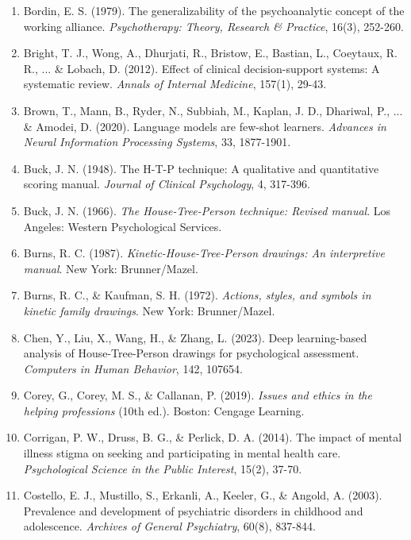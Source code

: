 \begin{enumerate}
\item Bordin, E. S. (1979). The generalizability of the psychoanalytic concept of the working alliance. \textit{Psychotherapy: Theory, Research \& Practice}, 16(3), 252-260.

\item Bright, T. J., Wong, A., Dhurjati, R., Bristow, E., Bastian, L., Coeytaux, R. R., ... \& Lobach, D. (2012). Effect of clinical decision-support systems: A systematic review. \textit{Annals of Internal Medicine}, 157(1), 29-43.

\item Brown, T., Mann, B., Ryder, N., Subbiah, M., Kaplan, J. D., Dhariwal, P., ... \& Amodei, D. (2020). Language models are few-shot learners. \textit{Advances in Neural Information Processing Systems}, 33, 1877-1901.

\item Buck, J. N. (1948). The H-T-P technique: A qualitative and quantitative scoring manual. \textit{Journal of Clinical Psychology}, 4, 317-396.

\item Buck, J. N. (1966). \textit{The House-Tree-Person technique: Revised manual}. Los Angeles: Western Psychological Services.

\item Burns, R. C. (1987). \textit{Kinetic-House-Tree-Person drawings: An interpretive manual}. New York: Brunner/Mazel.

\item Burns, R. C., \& Kaufman, S. H. (1972). \textit{Actions, styles, and symbols in kinetic family drawings}. New York: Brunner/Mazel.

\item Chen, Y., Liu, X., Wang, H., \& Zhang, L. (2023). Deep learning-based analysis of House-Tree-Person drawings for psychological assessment. \textit{Computers in Human Behavior}, 142, 107654.

\item Corey, G., Corey, M. S., \& Callanan, P. (2019). \textit{Issues and ethics in the helping professions} (10th ed.). Boston: Cengage Learning.

\item Corrigan, P. W., Druss, B. G., \& Perlick, D. A. (2014). The impact of mental illness stigma on seeking and participating in mental health care. \textit{Psychological Science in the Public Interest}, 15(2), 37-70.

\item Costello, E. J., Mustillo, S., Erkanli, A., Keeler, G., \& Angold, A. (2003). Prevalence and development of psychiatric disorders in childhood and adolescence. \textit{Archives of General Psychiatry}, 60(8), 837-844.


\end{enumerate}
